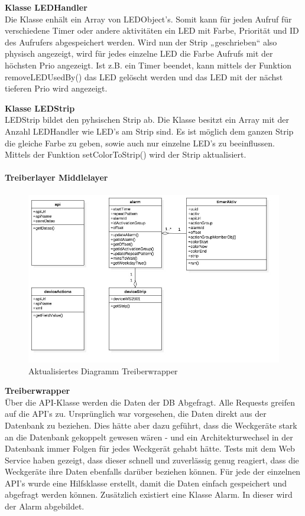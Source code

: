 \documentclass[]{article}
\let\oldparagraph\paragraph
\renewcommand{\paragraph}[1]{\oldparagraph{#1}\mbox{}}
\begin{document}
\textbf{Klasse LEDHandler}\\
Die Klasse enhält ein Array von LEDObject's. Somit kann für jeden Aufruf
für verschiedene Timer oder andere aktivitäten ein LED mit Farbe,
Priorität und ID des Aufrufers abgespeichert werden. Wird nun der Strip
„geschrieben`` also physisch angezeigt, wird für jedes einzelne LED die
Farbe Aufrufs mit der höchsten Prio angezeigt. Ist z.B. ein Timer
beendet, kann mittels der Funktion removeLEDUsedBy() das LED gelöscht
werden und das LED mit der nächst tieferen Prio wird angezeigt.

\textbf{Klasse LEDStrip}\\
LEDStrip bildet den pyhsischen Strip ab. Die Klasse besitzt ein Array
mit der Anzahl LEDHandler wie LED's am Strip sind. Es ist möglich dem
ganzen Strip die gleiche Farbe zu geben, sowie auch nur einzelne LED's
zu beeinflussen. Mittels der Funktion setColorToStrip() wird der Strip
aktualisiert.

\paragraph{Treiberlayer Middlelayer}\label{treiberlayer-middlelayer}

\begin{figure}[H]
\centering
\includegraphics{./WI61DriverMiddlelayer.jpeg}
\caption{Aktualisiertes Diagramm Treiberwrapper}
\end{figure}

 \textbf{Treiberwrapper}\\
Über die API-Klasse werden die Daten der DB Abgefragt. Alle Requests
greifen auf die API's zu. Ursprünglich war vorgesehen, die Daten direkt
aus der Datenbank zu beziehen. Dies hätte aber dazu geführt, dass die
Weckgeräte stark an die Datenbank gekoppelt gewesen wären - und ein
Architekturwechsel in der Datenbank immer Folgen für jedes Weckgerät
gehabt hätte. Tests mit dem Web Service haben gezeigt, dass dieser
schnell und zuverlässig genug reagiert, dass die Weckgeräte ihre Daten
ebenfalls darüber beziehen können. Für jede der einzelnen API's wurde
eine Hilfsklasse erstellt, damit die Daten einfach gespeichert und
abgefragt werden können. Zusätzlich existiert eine Klasse Alarm. In
dieser wird der Alarm abgebildet.
\end{document}
